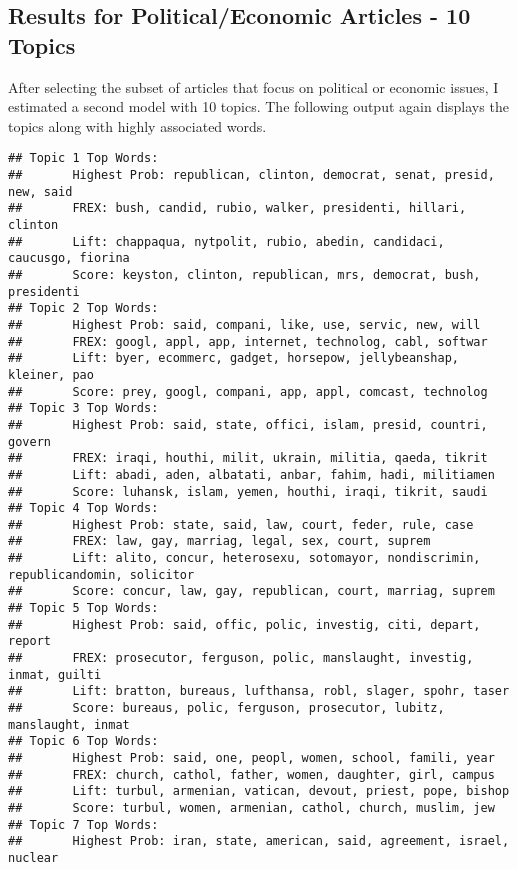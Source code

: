 \documentclass[12pt]{article}
\begin{document}
\begin{doublespace}
\section{Results for Political/Economic Articles - 10 Topics}

After selecting the subset of articles that focus on political or economic issues, I estimated a second model with 10 topics. The following output again displays the topics along with highly associated words.

\begin{knitrout}
\color{fgcolor}\begin{kframe}
\begin{verbatim}
## Topic 1 Top Words:
##  	 Highest Prob: republican, clinton, democrat, senat, presid, new, said 
##  	 FREX: bush, candid, rubio, walker, presidenti, hillari, clinton 
##  	 Lift: chappaqua, nytpolit, rubio, abedin, candidaci, caucusgo, fiorina 
##  	 Score: keyston, clinton, republican, mrs, democrat, bush, presidenti 
## Topic 2 Top Words:
##  	 Highest Prob: said, compani, like, use, servic, new, will 
##  	 FREX: googl, appl, app, internet, technolog, cabl, softwar 
##  	 Lift: byer, ecommerc, gadget, horsepow, jellybeanshap, kleiner, pao 
##  	 Score: prey, googl, compani, app, appl, comcast, technolog 
## Topic 3 Top Words:
##  	 Highest Prob: said, state, offici, islam, presid, countri, govern 
##  	 FREX: iraqi, houthi, milit, ukrain, militia, qaeda, tikrit 
##  	 Lift: abadi, aden, albatati, anbar, fahim, hadi, militiamen 
##  	 Score: luhansk, islam, yemen, houthi, iraqi, tikrit, saudi 
## Topic 4 Top Words:
##  	 Highest Prob: state, said, law, court, feder, rule, case 
##  	 FREX: law, gay, marriag, legal, sex, court, suprem 
##  	 Lift: alito, concur, heterosexu, sotomayor, nondiscrimin, republicandomin, solicitor 
##  	 Score: concur, law, gay, republican, court, marriag, suprem 
## Topic 5 Top Words:
##  	 Highest Prob: said, offic, polic, investig, citi, depart, report 
##  	 FREX: prosecutor, ferguson, polic, manslaught, investig, inmat, guilti 
##  	 Lift: bratton, bureaus, lufthansa, robl, slager, spohr, taser 
##  	 Score: bureaus, polic, ferguson, prosecutor, lubitz, manslaught, inmat 
## Topic 6 Top Words:
##  	 Highest Prob: said, one, peopl, women, school, famili, year 
##  	 FREX: church, cathol, father, women, daughter, girl, campus 
##  	 Lift: turbul, armenian, vatican, devout, priest, pope, bishop 
##  	 Score: turbul, women, armenian, cathol, church, muslim, jew 
## Topic 7 Top Words:
##  	 Highest Prob: iran, state, american, said, agreement, israel, nuclear 

\end{verbatim}
\end{kframe}
\end{knitrout}
\end{doublespace}
\end{document}
